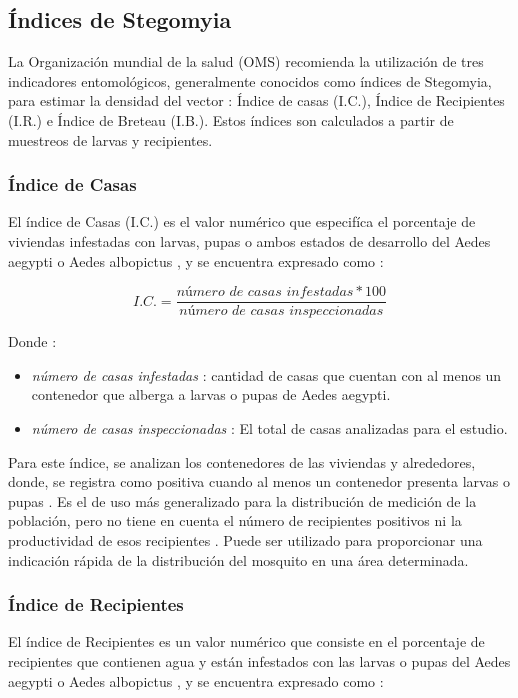 
\subsection{Índices de Stegomyia}
\label{sec:densidad-vectorial-indices-stegomia}
La Organización mundial de la salud (OMS) recomienda la utilización de tres indicadores
entomológicos, generalmente conocidos como índices de Stegomyia, para estimar la densidad del
vector : Índice de casas (I.C.), Índice de Recipientes (I.R.) e Índice de Breteau (I.B.). Estos
índices son calculados a partir de muestreos de larvas y recipientes.

\subsubsection{Índice de Casas}
El índice de Casas (I.C.) es el valor numérico que especifíca el porcentaje de viviendas
infestadas con larvas, pupas o ambos estados de desarrollo del Aedes aegypti o Aedes albopictus
\cite{ibanez1995vectores, world2009dengue}, y se encuentra expresado como :

\begin{equation}
I.C. = \frac{\textit{número de casas infestadas} * 100}{\textit{número de casas inspeccionadas}}
\end{equation}

Donde :
\begin{itemize}
\item \textit{número de casas infestadas} : cantidad de casas que cuentan con al menos un contenedor que alberga a larvas o pupas de Aedes aegypti.
\item \textit{número de casas inspeccionadas} : El total de casas analizadas para el estudio.
\end{itemize}

Para este índice, se analizan los contenedores de las viviendas y alrededores, donde, se registra
como positiva cuando al menos un contenedor presenta larvas o pupas \cite{ibanez1995vectores}. Es
el de uso más generalizado para la distribución de medición de la población, pero no tiene en
cuenta el número de recipientes positivos ni la productividad de esos recipientes
\cite{world2009dengue}. Puede ser utilizado para proporcionar una indicación rápida de la
distribución del mosquito en una área determinada.

\subsubsection{Índice de Recipientes}
El índice de Recipientes es un valor numérico que consiste en el porcentaje de recipientes que
contienen agua y están infestados con las larvas o pupas del Aedes aegypti o Aedes albopictus
\cite{ibanez1995vectores, world2009dengue}, y se encuentra expresado como :

